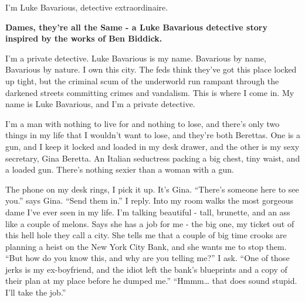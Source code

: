 I'm Luke Bavarious, detective extraordinaire. 

 





{\bf Dames, they're all the Same - a Luke Bavarious detective story
inspired by the works of Ben Biddick.}



I'm a private detective. Luke Bavarious is my name. Bavarious by
name, Bavarious by nature. I own this city. The feds think they've
got this place locked up tight, but the criminal scum of the
underworld run rampant through the darkened streets committing
crimes and vandalism. This is where I come in. My name is Luke
Bavarious, and I'm a private detective.



I'm a man with nothing to live for and nothing to lose, and there's
only two things in my life that I wouldn't want to lose, and
they're both Berettas. One is a gun, and I keep it locked and
loaded in my desk drawer, and the other is my sexy secretary, Gina
Beretta. An Italian seductress packing a big chest, tiny waist, and
a loaded gun. There's nothing sexier than a woman with a gun.



The phone on my desk rings, I pick it up. It's Gina. ``There's
someone here to see you.'' says Gina. ``Send them in.'' I reply. Into
my room walks the most gorgeous dame I've ever seen in my life. I'm
talking beautiful - tall, brunette, and an ass like a couple of
melons. Says she has a job for me - the big one, my ticket out of
this hell hole they call a city. She tells me that a couple of big
time crooks are planning a heist on the New York City Bank, and she
wants me to stop them. ``But how do you know this, and why are you
telling me?'' I ask. ``One of those jerks is my ex-boyfriend, and the
idiot left the bank's blueprints and a copy of their plan at my
place before he dumped me.'' ``Hmmm{\ldots} that does sound stupid. I'll
take the job.''




